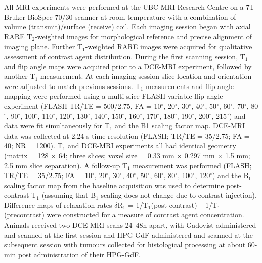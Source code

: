 All MRI experiments were performed at the UBC MRI Research Centre on a 7T Bruker BioSpec 70/30 scanner at room temperature with a combination of volume (transmit)/surface (receive) coil.
Each imaging session began with axial RARE T$_2$-weighted images for morphological reference and precise alignment of imaging plane.
Further T$_1$-weighted RARE images were acquired for qualitative assessment of contrast agent distribution.
During the first scanning session, T$_1$ and flip angle maps were acquired prior to a DCE-MRI experiment, followed by another T$_1$ measurement.
At each imaging session slice location and orientation were adjusted to match previous sessions.
T$_1$ measurements and flip angle mapping were performed using a multi-slice FLASH variable flip angle experiment (FLASH TR/TE = 500/2.75, FA = 10$^{\circ}$, 20$^{\circ}$, 30$^{\circ}$, 40$^{\circ}$, 50$^{\circ}$, 60$^{\circ}$, 70$^{\circ}$, 80$^{\circ}$, 90$^{\circ}$, 100$^{\circ}$, 110$^{\circ}$, 120$^{\circ}$, 130$^{\circ}$, 140$^{\circ}$, 150$^{\circ}$, 160$^{\circ}$, 170$^{\circ}$, 180$^{\circ}$, 190$^{\circ}$, 200$^{\circ}$, 215$^{\circ}$) and data were fit simultaneously for T$_1$ and the B1 scaling factor map.
DCE-MRI data was collected at 2.24 s time resolution (FLASH; TR/TE = 35/2.75; FA = 40; NR = 1200).
T$_1$ and DCE-MRI experiments all had identical geometry (matrix = 128 × 64; three slices; voxel size = 0.33 mm × 0.297 mm × 1.5 mm; 2.5 mm slice separation).
A follow-up T$_1$ measurement was performed (FLASH; TR/TE = 35/2.75; FA = 10$^{\circ}$, 20$^{\circ}$, 30$^{\circ}$, 40$^{\circ}$, 50$^{\circ}$, 60$^{\circ}$, 80$^{\circ}$, 100$^{\circ}$, 120$^{\circ}$) and the B$_1$ scaling factor map from the baseline acquisition was used to determine post-contrast T$_1$ (assuming that B$_1$ scaling does not change due to contrast injection).
Difference maps of relaxation rates $\delta$R$_1$ = 1/T$_1$(post-contrast) – 1/T$_1$(precontrast) were constructed for a measure of contrast agent concentration.
Animals received two DCE-MRI scans 24–48h apart, with Gadovist administered and scanned at the first session and HPG-GdF administered and scanned at the subsequent session with tumours collected for histological processing at about 60-min post administration of their HPG-GdF.

